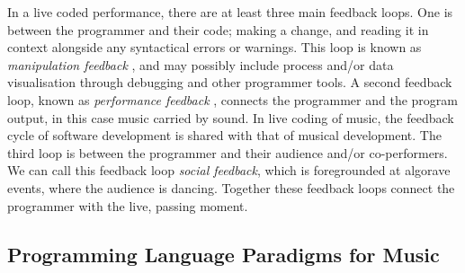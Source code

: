\documentclass[authoryear,preprint]{sigplanconf}
\begin{document}
In a live coded performance, there are at least three main feedback
loops. One is between the programmer and their code; making a change,
and reading it in context alongside any syntactical errors or
warnings. This loop is known as \emph{manipulation feedback}
\citep{Nash11}, and may possibly include process and/or data
visualisation through debugging and other programmer tools. A second
feedback loop, known as \emph{performance feedback} \citep{Nash11},
connects the programmer and the program output, in this case music
carried by sound. In live coding of music, the feedback cycle of
software development is shared with that of musical development. The
third loop is between the programmer and their audience and/or
co-performers. We can call this feedback loop \emph{social feedback},
which is foregrounded at algorave events, where the audience is
dancing.  Together these feedback loops connect the programmer with
the live, passing moment.



\subsection{Programming Language Paradigms for Music}

\end{document}
